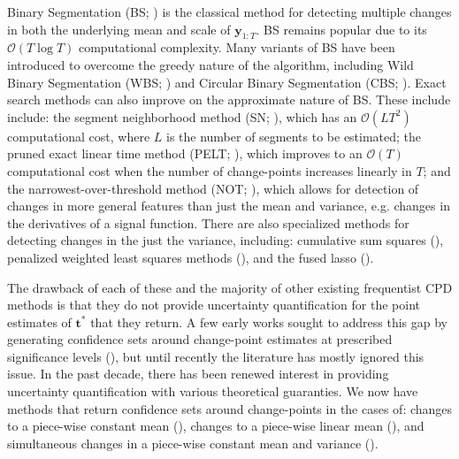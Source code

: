 Binary Segmentation (BS; \citealp{Scott74, Sen75, Vostrikova81}) is the classical method for detecting multiple changes in both the underlying mean and scale of $\mathbf{y}_{1:T}$. BS remains popular due to its $\mathcal{O}(T\log T)$ computational complexity. Many variants of BS have been introduced to overcome the greedy nature of the algorithm, including Wild Binary Segmentation (WBS; \citealp{Fryzlewicz14}) and Circular Binary Segmentation (CBS; \citealp{Olshen04}). Exact search methods can also improve on the approximate nature of BS. These include include: the segment neighborhood method (SN; \citealp{Auger89}), which has an $\mathcal{O}(LT^2)$ computational cost, where $L$ is the number of segments to be estimated; the pruned exact linear time method (PELT; \citealp{Killick12}), which improves to an $\mathcal{O}(T)$ computational cost when the number of change-points increases linearly in $T$; and the narrowest-over-threshold method (NOT; \citealp{Baranowski19}), which allows for detection of changes in more general features than just the mean and variance, e.g. changes in the derivatives of a signal function. There are also specialized methods for detecting changes in the just the variance, including: cumulative sum squares (\citealp{Inclan94}), penalized weighted least squares methods (\citealp{Chen97, Gao19}), and the fused lasso (\citealp{Padilla22}). 

The drawback of each of these and the majority of other existing frequentist CPD methods is that they do not provide uncertainty quantification for the point estimates of $\mathbf{t}^*$ that they return. A few early works sought to address this gap by generating confidence sets around change-point estimates at prescribed significance levels (\citealp{Worsley86, Siegmund86, Bai03}), but until recently the literature has mostly ignored this issue. In the past decade, there has been renewed interest in providing uncertainty quantification with various theoretical guaranties. We now have methods that return confidence sets around change-points in the cases of: changes to a piece-wise constant mean (\citealp{Frick14, Fang20, Jewell22}), changes to a piece-wise linear mean (\citealp{Fryzlewicz23}), and simultaneous changes in a piece-wise constant mean and variance (\citealp{Bai10, Pein17, Eichinger18}). 

